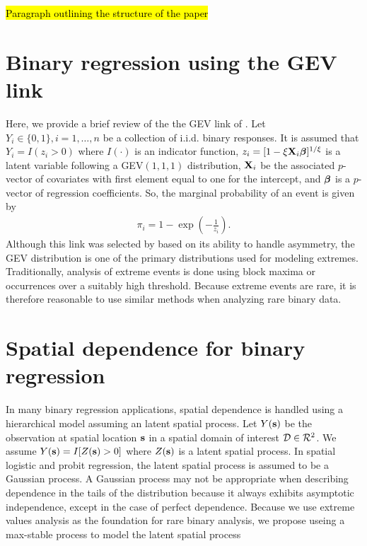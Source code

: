 \hl{Paragraph outlining the structure of the paper}

\section{Binary regression using the GEV link}\label{s:rarebinary}

Here, we provide a brief review of the the GEV link of \citet{Wang2010}.
Let $Y_i \in \{0, 1\}, i = 1, \ldots, n$ be a collection of i.i.d. binary responses.
It is assumed that $Y_i = I(z_i > 0)$ where $I(\cdot)$ is an indicator function, $z_i = [1 - \xi \mathbf{X}_i \mbox{\boldmath $\beta$}]^{1 / \xi}$ is a latent variable following a GEV$(1, 1, 1)$ distribution, $\mathbf{X}_i$ be the associated $p$-vector of covariates with first element equal to one for the intercept, and $\mbox{\boldmath $\beta$}$ is a $p$-vector of regression coefficients.
So, the marginal probability of an event is given by
\begin{align} \label{eq:gevlink}
  \pi_i= 1 - \exp \left( -\frac{ 1 }{ z_i } \right).
\end{align}
Although this link was selected by \citeauthor{Wang2010} based on its ability to handle asymmetry, the GEV distribution is one of the primary distributions used for modeling extremes.
Traditionally, analysis of extreme events is done using block maxima or occurrences over a suitably high threshold.
Because extreme events are rare, it is therefore reasonable to use similar methods when analyzing rare binary data.

\section{Spatial dependence for binary regression}

In many binary regression applications, spatial dependence is handled using a hierarchical model assuming an latent spatial process.
Let $Y(\mathbf{s})$ be the observation at spatial location $\mathbf{s}$ in a spatial domain of interest ${\cal D} \in {\cal R}^2$.
We assume $Y(\mathbf{s}) = I[Z(\mathbf{s}) > 0]$ where $Z(\mathbf{s})$ is a latent spatial process.
In spatial logistic and probit regression, the latent spatial process is assumed to be a Gaussian process.
A Gaussian process may not be appropriate when describing dependence in the tails of the distribution because it always exhibits asymptotic independence, except in the case of perfect dependence.
Because we use extreme values analysis as the foundation for rare binary analysis, we propose useing a max-stable process to model the latent spatial process

